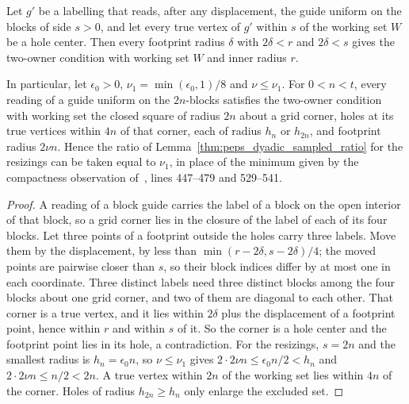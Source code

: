 \begin{lemma}
    \label{thm:peps_dyadic_block_reading_ratio}
    \leanok
    Let $g'$ be a labelling that reads, after any displacement, the guide uniform
    on the blocks of side $s>0$, and let every true vertex of $g'$ within $s$ of
    the working set $W$ be a hole center. Then every footprint radius $\delta$
    with $2\delta<r$ and $2\delta<s$ gives the two-owner condition with working
    set $W$ and inner radius $r$.

    In particular, let $\epsilon_0>0$, $\nu_1=\min(\epsilon_0,1)/8$ and
    $\nu\le\nu_1$. For $0<n<t$, every reading of a guide uniform on the
    $2n$-blocks satisfies the two-owner condition with working set the closed
    square of radius $2n$ about a grid corner, holes at its true vertices within
    $4n$ of that corner, each of radius $h_n$ or $h_{2n}$, and footprint radius
    $2\nu n$. Hence the ratio of Lemma~\ref{thm:peps_dyadic_sampled_ratio} for
    the resizings can be taken equal to $\nu_1$, in place of the minimum given by
    the compactness observation of~\cite[Section~7]{OpenAI2026PolynomialPEPS},
    lines 447--479 and 529--541.
\end{lemma}

\begin{proof}\leanok
    A reading of a block guide carries the label of a block on the open interior
    of that block, so a grid corner lies in the closure of the label of each of
    its four blocks. Let three points of a footprint outside the holes carry
    three labels. Move them by the displacement, by less than
    $\min(r-2\delta,s-2\delta)/4$; the moved points are pairwise closer than $s$,
    so their block indices differ by at most one in each coordinate. Three
    distinct labels need three distinct blocks among the four blocks about one
    grid corner, and two of them are diagonal to each other. That corner is a
    true vertex, and it lies within $2\delta$ plus the displacement of a
    footprint point, hence within $r$ and within $s$ of it. So the corner is a
    hole center and the footprint point lies in its hole, a contradiction. For
    the resizings, $s=2n$ and the smallest radius is $h_n=\epsilon_0n$, so
    $\nu\le\nu_1$ gives $2\cdot2\nu n\le\epsilon_0n/2<h_n$ and
    $2\cdot2\nu n\le n/2<2n$. A true vertex within $2n$ of the working set lies
    within $4n$ of the corner. Holes of radius $h_{2n}\ge h_n$ only enlarge the
    excluded set.
\end{proof}

